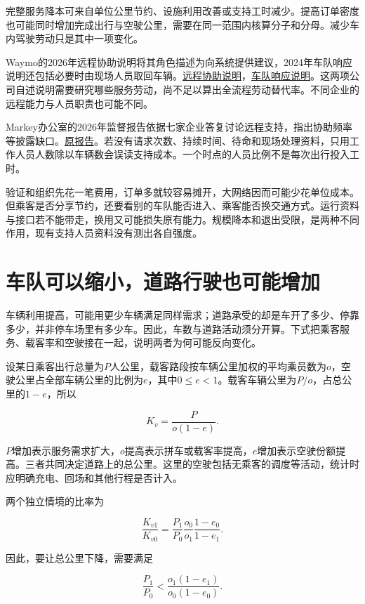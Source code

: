 \documentclass[UTF8,fontset=windows,12pt,a4paper,oneside,openany]{ctexbook}
\begin{document}
完整服务降本可来自单位公里节约、设施利用改善或支持工时减少。提高订单密度也可能同时增加完成出行与空驶公里，需要在同一范围内核算分子和分母。减少车内驾驶劳动只是其中一项变化。

Waymo的2026年远程协助说明将其角色描述为向系统提供建议，2024年车队响应说明还包括必要时由现场人员取回车辆。\href{https://waymo.com/blog/shorts/advice-not-control-the-role-of-remote-assistance/}{远程协助说明}，\href{https://waymo.com/blog/2024/05/fleet-response/}{车队响应说明}。这两项公司自述说明需要研究哪些服务劳动，尚不足以算出全流程劳动替代率。不同企业的远程能力与人员职责也可能不同。

Markey办公室的2026年监督报告依据七家企业答复讨论远程支持，指出协助频率等披露缺口。\href{https://www.markey.senate.gov/imo/media/doc/remote_assistance_investigation_report.pdf}{原报告}。若没有请求次数、持续时间、待命和现场处理资料，只用工作人员人数除以车辆数会误读支持成本。一个时点的人员比例不是每次出行投入工时。

验证和组织先花一笔费用，订单多就较容易摊开，大网络因而可能少花单位成本。但乘客是否分享节约，还要看别的车队能否进入、乘客能否换交通方式。运行资料与接口若不能带走，换用又可能损失原有能力。规模降本和退出受限，是两种不同作用，现有支持人员资料没有测出各自强度。

\section{车队可以缩小，道路行驶也可能增加}

车辆利用提高，可能用更少车辆满足同样需求；道路承受的却是车开了多少、停靠多少，并非停车场里有多少车。因此，车数与道路活动须分开算。下式把乘客服务、载客率和空驶接在一起，说明两者为何可能反向变化。

设某日乘客出行总量为\(P\)人公里，载客路段按车辆公里加权的平均乘员数为\(o\)，空驶公里占全部车辆公里的比例为\(e\)，其中\(0\leq e<1\)。载客车辆公里为\(P/o\)，占总公里的\(1-e\)，所以

\[
K_v=\frac{P}{o(1-e)}.
\tag{10-5}
\]

\(P\)增加表示服务需求扩大，\(o\)提高表示拼车或载客率提高，\(e\)增加表示空驶份额提高。三者共同决定道路上的总公里。这里的空驶包括无乘客的调度等活动，统计时应明确充电、回场和其他行程是否计入。

两个独立情境的比率为

\[
\frac{K_{v1}}{K_{v0}}
=\frac{P_1}{P_0}\frac{o_0}{o_1}\frac{1-e_0}{1-e_1}.
\tag{10-6}
\]

因此，要让总公里下降，需要满足

\[
\frac{P_1}{P_0}
<\frac{o_1(1-e_1)}{o_0(1-e_0)}.
\tag{10-7}
\]
\end{document}
